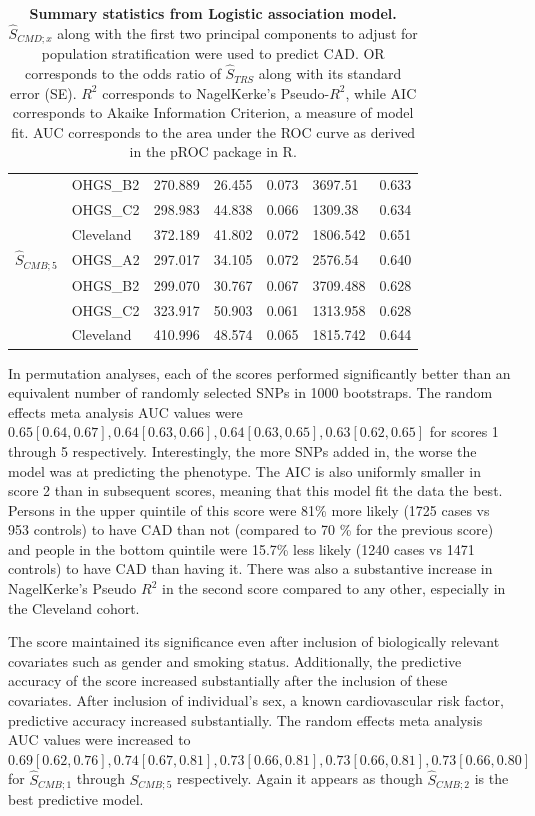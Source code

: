 \begin{table}[H]
\begin{tabular}{lllllll}
      & OHGS\_B2         & 270.889  & 26.455 & 0.073 & 3697.51  & 0.633 \\
      & OHGS\_C2         & 298.983  & 44.838 & 0.066 & 1309.38  & 0.634 \\
      & Cleveland        & 372.189   & 41.802 & 0.072 & 1806.542 & 0.651 \\ \hline
$\hat{S}_{CMB; 5}$     & OHGS\_A2         & 297.017  & 34.105 & 0.072 & 2576.54  & 0.640 \\
      & OHGS\_B2         & 299.070  & 30.767 & 0.067 & 3709.488 & 0.628 \\
      & OHGS\_C2         & 323.917  & 50.903 & 0.061 & 1313.958 & 0.628 \\
      & Cleveland        & 410.996  & 48.574 & 0.065 & 1815.742 & 0.644 \\ \hline
\end{tabular}
\label{cmd-sum}
\caption[Summary statistics from Logistic association model for $\hat{S}_{CMD}$.]{\textbf{Summary statistics from Logistic association model.} $\hat{S}_{CMD; x}$ along with the first two principal components to adjust for population stratification were used to predict \ac{CAD}. OR corresponds to the odds ratio of $\hat{S}_{TRS}$ along with its standard error (SE). $R^2$ corresponds to NagelKerke's Pseudo-$R^2$, while AIC corresponds to Akaike Information Criterion, a measure of model fit. AUC corresponds to the area under the \ac{ROC} curve as derived in the pROC package in R.}
\end{table}

In permutation analyses, each of the scores performed significantly better than an equivalent number of randomly selected \acp{SNP} in 1000 bootstraps. The random effects meta analysis \ac{AUC} values were $0.65 [ 0.64, 0.67], 0.64[0.63, 0.66], 0.64[0.63, 0.65], 0.63[0.62, 0.65]$ for scores 1 through 5 respectively. Interestingly, the more \acp{SNP} added in, the worse the model was at predicting the phenotype. The \ac{AIC} is also uniformly smaller in score 2 than in subsequent scores, meaning that this model fit the data the best. Persons in the upper quintile of this score were 81\% more likely (1725 cases vs 953 controls) to have \ac{CAD} than not (compared to 70 \% for the previous score) and people in the bottom quintile were 15.7\% less likely (1240 cases vs 1471 controls) to have \ac{CAD} than having it. There was also a substantive increase in NagelKerke's Pseudo $R^2$ in the second score compared to any other, especially in the Cleveland cohort. 

The score maintained its significance even after inclusion of biologically relevant covariates such as gender and smoking status. Additionally, the predictive accuracy of the score increased substantially after the inclusion of these covariates. After inclusion of individual's sex, a known cardiovascular risk factor, predictive accuracy increased substantially. The random effects meta analysis \ac{AUC} values were increased to $0.69[0.62, 0.76], 0.74[0.67, 0.81], 0.73 [0.66, 0.81], 0.73[0.66, 0.81], 0.73[0.66, 0.80]$ for $\hat{S}_{CMB; 1}$ through $\hat{S}_{CMB; 5}$ respectively. Again it appears as though $\hat{S}_{CMB; 2}$ is the best predictive model.



